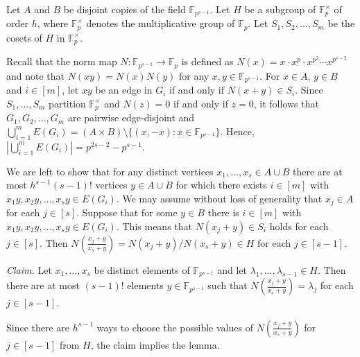 \documentclass[a4paper,11pt]{article}
\makeatletter
\renewenvironment{proof}[1][\proofname] {\par\pushQED{\qed}\normalfont\topsep6\p@\@plus6\p@\relax\trivlist\item[\hskip\labelsep\bfseries#1\@addpunct{.}]\ignorespaces}{\popQED\endtrivlist\@endpefalse}
\theoremstyle{definition}
\makeatother
\begin{document}
\begin{proof}[Proof of Lemma \ref{lem:good partition exists}]
    Let $A$ and $B$ be disjoint copies of the field $\mathbb{F}_{p^{s-1}}$. Let $H$ be a subgroup of $\mathbb{F}_p^{\times}$ of order $h$, where $\mathbb{F}_p^{\times}$ denotes the multiplicative group of $\mathbb{F}_p$. Let $S_1,S_2,\dots,S_m$ be the cosets of $H$ in $\mathbb{F}_p^{\times}$.
    
    Recall that the norm map $N \colon \mathbb{F}_{p^{s-1}}\rightarrow \mathbb{F}_p$ is defined as $N(x) = x \cdot x^p \cdot x^{p^2} \cdots x^{p^{s-2}}$ and note that $N(xy) = N(x)N(y)$ for any $x, y \in \mathbb{F}_{p^{s-1}}$. For $x\in A$, $y\in B$ and $i\in [m]$, let $xy$ be an edge in $G_i$ if and only if $N(x+y)\in S_i$. Since $S_1,\dots,S_m$ partition $\mathbb{F}_p^{\times}$ and $N(z)=0$ if and only if $z=0$, it follows that $G_1,G_2,\dots,G_m$ are pairwise edge-disjoint and $\bigcup_{i=1}^{m} E(G_i)=(A\times B)\setminus \{(x,-x):x\in \mathbb{F}_{p^{s-1}}\}$. Hence, $|\bigcup_{i=1}^{m} E(G_i)|=p^{2s-2}-p^{s-1}$.
    
    We are left to show that for any distinct vertices $x_1,\dots,x_s\in A\cup B$ there are at most $h^{s-1}(s-1)!$ vertices $y\in A\cup B$ for which there exists $i\in [m]$ with $x_1y,x_2y,\dots,x_sy\in E(G_i)$. We may assume without loss of generality that $x_j\in A$ for each $j\in [s]$. Suppose that for some $y\in B$ there is $i\in [m]$ with $x_1y,x_2y,\dots,x_sy\in E(G_i)$. This means that $N(x_j+y)\in S_i$ holds for each $j\in [s]$. Then $N(\frac{x_j+y}{x_s+y})=N(x_j+y)/N(x_s+y)\in H$ for each $j\in [s-1]$.
    
    \medskip
    
    \noindent \emph{Claim.} Let $x_1,\dots,x_s$ be distinct elements of $\mathbb{F}_{p^{s-1}}$ and let $\lambda_1,\dots,\lambda_{s-1}\in H$. Then there are at most $(s-1)!$ elements $y\in \mathbb{F}_{p^{s-1}}$ such that $N(\frac{x_j+y}{x_s+y})=\lambda_j$ for each $j\in [s-1]$.
    
    \medskip
    
    Since there are $h^{s-1}$ ways to choose the possible values of $N(\frac{x_j+y}{x_s+y})$ for $j\in [s-1]$ from $H$, the claim implies the lemma.
    
    \medskip
    

\end{proof}
\end{document}
